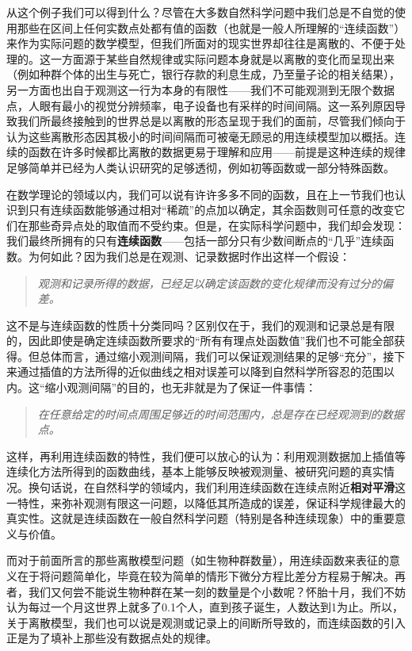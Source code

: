 \documentclass[12pt,a4paper]{article}
\begin{document}
{{			从这个例子我们可以得到什么？尽管在大多数自然科学问题中我们总是不自觉的使用那些在区间上任何实数点处都有值的函数（也就是一般人所理解的“连续函数”）来作为实际问题的数学模型，但我们所面对的现实世界却往往是离散的、不便于处理的。这一方面源于某些自然规律或实际问题本身就是以离散的变化而呈现出来（例如种群个体的出生与死亡，银行存款的利息生成，乃至量子论的相关结果），另一方面也出自于观测这一行为本身的有限性——我们不可能观测到无限个数据点，人眼有最小的视觉分辨频率，电子设备也有采样的时间间隔。这一系列原因导致我们所最终接触到的世界总是以离散的形态呈现于我们的面前，尽管我们倾向于认为这些离散形态因其极小的时间间隔而可被毫无顾忌的用连续模型加以概括。连续的函数在许多时候都比离散的数据更易于理解和应用——前提是这种连续的规律足够简单并已经为人类认识研究的足够透彻，例如初等函数或一部分特殊函数。
			
			在数学理论的领域以内，我们可以说有许许多多不同的函数，且在上一节我们也认识到只有连续函数能够通过相对“稀疏”的点加以确定，其余函数则可任意的改变它们在那些奇异点处的取值而不受约束。但是，在实际科学问题中，我们却会发现：我们最终所拥有的只有{\bfseries 连续函数}——包括一部分只有少数间断点的“几乎”连续函数。为何如此？因为我们总是在观测、记录数据时作出这样一个假设：
			\begin{quote}\itshape
				观测和记录所得的数据，已经足以确定该函数的变化规律而没有过分的偏差。
			\end{quote}
		
			这不是与连续函数的性质十分类同吗？区别仅在于，我们的观测和记录总是有限的，因此即使是确定连续函数所要求的“所有有理点处函数值”我们也不可能全部获得。但总体而言，通过缩小观测间隔，我们可以保证观测结果的足够“充分”，接下来通过插值的方法所得的近似曲线之相对误差可以降到自然科学所容忍的范围以内。这“缩小观测间隔”的目的，也无非就是为了保证一件事情：
			\begin{quote}\itshape
				在任意给定的时间点周围足够近的时间范围内，总是存在已经观测到的数据点。
			\end{quote}
		
			这样，再利用连续函数的特性，我们便可以放心的认为：利用观测数据加上插值等连续化方法所得到的函数曲线，基本上能够反映被观测量、被研究问题的真实情况。换句话说，在自然科学的领域内，我们利用连续函数在连续点附近{\bfseries 相对平滑}这一特性，来弥补观测有限这一问题，以降低其所造成的误差，保证科学规律最大的真实性。这就是连续函数在一般自然科学问题（特别是各种连续现象）中的重要意义与价值。
			
			而对于前面所言的那些离散模型问题（如生物种群数量），用连续函数来表征的意义在于将问题简单化，毕竟在较为简单的情形下微分方程比差分方程易于解决。再者，我们又何尝不能说生物种群在某一刻的数量是个小数呢？怀胎十月，我们不妨认为每过一个月这世界上就多了0.1个人，直到孩子诞生，人数达到1为止。所以，关于离散模型，我们也可以说是观测或记录上的间断所导致的，而连续函数的引入正是为了填补上那些没有数据点处的规律。
			
}}
\end{document}
